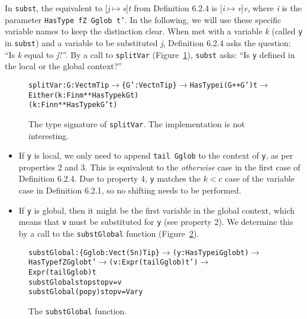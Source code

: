 In \texttt{subst}, the equivalent to [\textit{j}$\mapsto$\textit{s}]\textit{t} from Definition 6.2.4 is [\textit{i}$\mapsto$\textit{v}]\textit{e}, where \textit{i} is the parameter \texttt{HasType fZ Gglob t'}. In the following, we will use these specific variable names to keep the distinction clear. When met with a variable \textit{k} (called \texttt{y} in \texttt{subst}) and a variable to be substituted \textit{j}, Definition 6.2.4 asks the question: ``Is \textit{k} equal to \textit{j}?''. By a call to \texttt{splitVar} (Figure~\ref{fig:splitVar}), \texttt{subst} asks: ``Is \texttt{y} defined in the local or the global context?''

\begin{figure}
\begin{alltt}
splitVar : {G: Vect m Tip} \(\rightarrow\) \{G': Vect n Tip\} \(\rightarrow\) HasType i (G ++ G') t \(\rightarrow\)
           Either (k: Fin m ** HasType k G t) 
                  (k: Fin n ** HasType k G' t)
\end{alltt}
\caption{The type signature of \texttt{splitVar}. The implementation is not interesting.}
\label{fig:splitVar}
\end{figure}

\begin{itemize}
\item If \texttt{y} is local, we only need to append \texttt{tail Gglob} to the context of \texttt{y}, as per properties 2 and 3. This is equivalent to the \textit{otherwise} case in the first case of Definition 6.2.4. Due to property 4, \texttt{y} matches the $k < c$ case of the variable case in Definition 6.2.1, so no shifting needs to be performed.
\item If \texttt{y} is global, then it might be the first variable in the global context, which means that \texttt{v} must be substituted for \texttt{y} (see property 2). We determine this by a call to the \texttt{substGlobal} function (Figure~\ref{fig:substGlobal}).
\end{itemize}

\begin{figure}
\begin{alltt}
    substGlobal : \{Gglob : Vect (S n) Tip\} \(\rightarrow\) (y: HasType i Gglob t) \(\rightarrow\) 
                  HasType fZ Gglob t' \(\rightarrow\) (v: Expr (tail Gglob) t') \(\rightarrow\) 
                  Expr (tail Gglob) t
    substGlobal stop    stop v = v
    substGlobal (pop y) stop v = Var y
\end{alltt}
\caption{The \texttt{substGlobal} function.}
\label{fig:substGlobal}
\end{figure}


